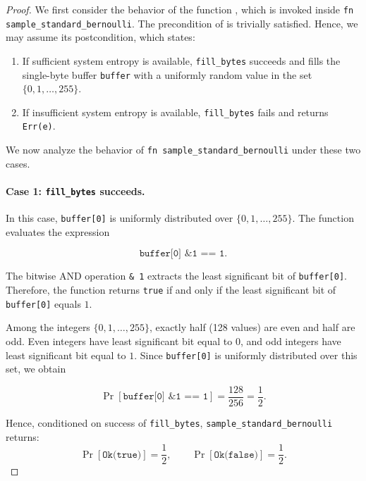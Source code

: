 \documentclass{article}
\begin{document}
\begin{proof}

We first consider the behavior of the function
, which is invoked inside
\texttt{fn sample\_standard\_bernoulli}. 
The precondition of 
is trivially satisfied. Hence, we may assume its postcondition, which states:

\begin{enumerate}
    \item If sufficient system entropy is available, 
    \texttt{fill\_bytes} succeeds and fills the single-byte buffer
    \texttt{buffer} with a uniformly random value in the set
    $\{0,1,\dots,255\}$.

    \item If insufficient system entropy is available,
    \texttt{fill\_bytes} fails and returns \texttt{Err(e)}.
\end{enumerate}

We now analyze the behavior of
\texttt{fn sample\_standard\_bernoulli} under these two cases.

\paragraph{Case 1: \texttt{fill\_bytes} succeeds.}

In this case, \texttt{buffer[0]} is uniformly distributed over
$\{0,1,\dots,255\}$. The function evaluates the expression

\[
\texttt{buffer[0] \& 1 == 1}.
\]

The bitwise AND operation \texttt{\& 1} extracts the least significant bit
of \texttt{buffer[0]}. Therefore, the function returns \texttt{true} if and
only if the least significant bit of \texttt{buffer[0]} equals $1$.

Among the integers $\{0,1,\dots,255\}$, exactly half (128 values) are even
and half are odd. Even integers have least significant bit equal to $0$,
and odd integers have least significant bit equal to $1$. Since
\texttt{buffer[0]} is uniformly distributed over this set, we obtain

\[
\Pr[\texttt{buffer[0] \& 1 == 1}] = \frac{128}{256} = \frac{1}{2}.
\]

Hence, conditioned on success of \texttt{fill\_bytes},
\texttt{sample\_standard\_bernoulli} returns:
\[
\Pr[\texttt{Ok(true)}] = \frac{1}{2},
\qquad
\Pr[\texttt{Ok(false)}] = \frac{1}{2}.
\]


\end{proof}
\end{document}
